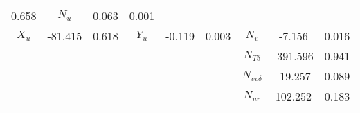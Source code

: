 \begin{table}[!htb]
\begin{tabular}{|c|c|c|c|c|c|c|c|c|}
0.658
&

\( N_{u} \)
&

0.063
&

0.001
\\


\( X_{u} \)
&

-81.415
&

0.618
&

\( Y_{u} \)
&

-0.119
&

0.003
&

\( N_{v} \)
&

-7.156
&

0.016
\\
&&&&&&

\( N_{T\delta} \)
&

-391.596
&

0.941
\\
&&&&&&

\( N_{vv\delta} \)
&

-19.257
&

0.089
\\
&&&&&&

\( N_{ur} \)
&

102.252
&

0.183
\\
\hline
\end{tabular}

\end{table}
